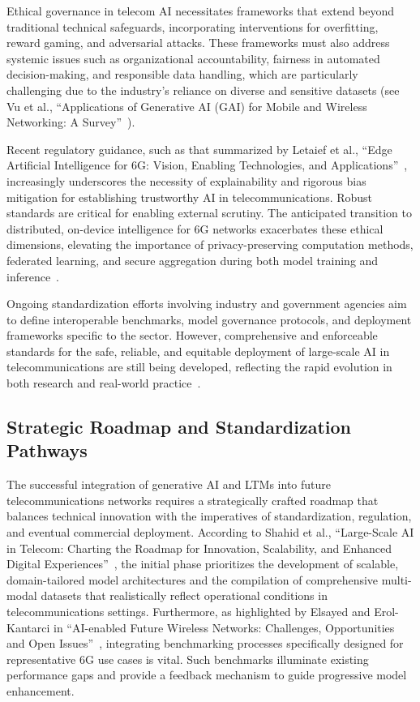 \documentclass[sigconf]{acmart}
\begin{document}
Ethical governance in telecom AI necessitates frameworks that extend beyond traditional technical safeguards, incorporating interventions for overfitting, reward gaming, and adversarial attacks. These frameworks must also address systemic issues such as organizational accountability, fairness in automated decision-making, and responsible data handling, which are particularly challenging due to the industry's reliance on diverse and sensitive datasets (see Vu et al., ``Applications of Generative AI (GAI) for Mobile and Wireless Networking: A Survey''~\cite{ref44}).

Recent regulatory guidance, such as that summarized by Letaief et al., ``Edge Artificial Intelligence for 6G: Vision, Enabling Technologies, and Applications''~\cite{ref49}, increasingly underscores the necessity of explainability and rigorous bias mitigation for establishing trustworthy AI in telecommunications. Robust standards are critical for enabling external scrutiny. The anticipated transition to distributed, on-device intelligence for 6G networks exacerbates these ethical dimensions, elevating the importance of privacy-preserving computation methods, federated learning, and secure aggregation during both model training and inference~\cite{ref44,ref49}.

Ongoing standardization efforts involving industry and government agencies aim to define interoperable benchmarks, model governance protocols, and deployment frameworks specific to the sector. However, comprehensive and enforceable standards for the safe, reliable, and equitable deployment of large-scale AI in telecommunications are still being developed, reflecting the rapid evolution in both research and real-world practice~\cite{ref49}.

\subsection{Strategic Roadmap and Standardization Pathways}

The successful integration of generative AI and LTMs into future telecommunications networks requires a strategically crafted roadmap that balances technical innovation with the imperatives of standardization, regulation, and eventual commercial deployment. According to Shahid et al., ``Large-Scale AI in Telecom: Charting the Roadmap for Innovation, Scalability, and Enhanced Digital Experiences''~\cite{ref33}, the initial phase prioritizes the development of scalable, domain-tailored model architectures and the compilation of comprehensive multi-modal datasets that realistically reflect operational conditions in telecommunications settings. Furthermore, as highlighted by Elsayed and Erol-Kantarci in ``AI-enabled Future Wireless Networks: Challenges, Opportunities and Open Issues''~\cite{ref46}, integrating benchmarking processes specifically designed for representative 6G use cases is vital. Such benchmarks illuminate existing performance gaps and provide a feedback mechanism to guide progressive model enhancement.
\end{document}
